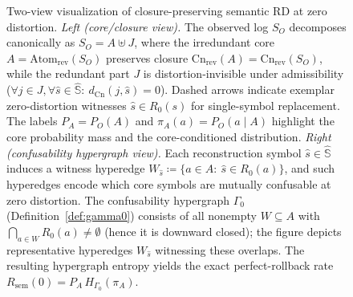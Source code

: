 \documentclass[twoside]{article}
\newcommand{\Cn}{\mathrm{Cn}}
\newcommand{\Atom}{\mathrm{Atom}}
\newcommand{\sem}{\mathrm{sem}}
\newcommand{\1}{\mathbf{1}}
\begin{document}
\begin{figure}[t]

\caption{Two-view visualization of closure-preserving semantic RD at zero distortion.
\emph{Left (core/closure view).} The observed log \(S_O\) decomposes canonically as \(S_O=A\uplus J\),
where the irredundant core \(A=\Atom_{\mathrm{rev}}(S_O)\) preserves closure
\(\Cn_{\mathrm{rev}}(A)=\Cn_{\mathrm{rev}}(S_O)\), while the redundant part \(J\) is distortion-invisible under admissibility
(\(\forall j\in J,\forall \hat s\in\hat{\mathbb{S}}:\ d_{\Cn}(j,\hat s)=0\)).
Dashed arrows indicate exemplar zero-distortion witnesses \(\hat s\in R_0(s)\) for single-symbol replacement.
The labels \(P_A=P_O(A)\) and \(\pi_A(a)=P_O(a\mid A)\) highlight the core probability mass and the core-conditioned distribution.
\emph{Right (confusability hypergraph view).} Each reconstruction symbol \(\hat s\in\hat{\mathbb{S}}\) induces a witness hyperedge
\(W_{\hat s}\coloneqq \{a\in A:\ \hat s\in R_0(a)\}\), and such hyperedges encode which core symbols are mutually confusable at
zero distortion. The confusability hypergraph \(\Gamma_0\) (Definition~\ref{def:gamma0}) consists of all nonempty
\(W\subseteq A\) with \(\bigcap_{a\in W}R_0(a)\neq\emptyset\) (hence it is downward closed); the figure depicts representative
hyperedges \(W_{\hat s}\) witnessing these overlaps.
The resulting hypergraph entropy yields the exact perfect-rollback rate \(R_{\sem}(0)=P_A\,H_{\Gamma_0}(\pi_A)\).}
\label{fig:sem-rd-zero}
\end{figure}
\end{document}
